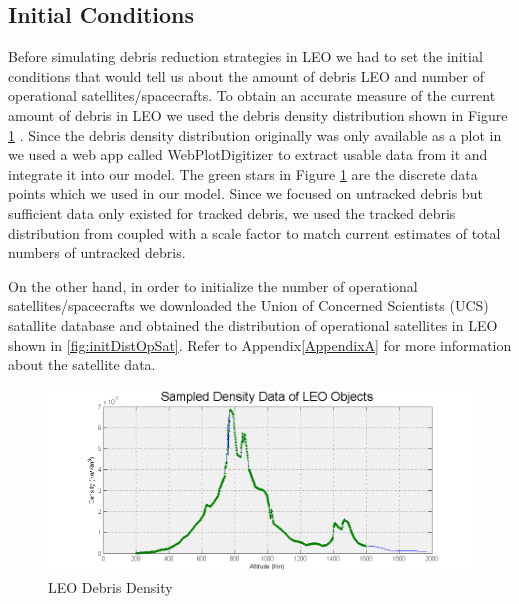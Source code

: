 \documentclass[pre,12pt]{revtex4-1}
\begin{document}
\subsection{Initial Conditions}
Before simulating debris reduction strategies in LEO we had to set the initial conditions that would tell us about the amount of debris LEO and number of operational satellites/spacecrafts. To obtain an accurate measure of the current amount of debris in LEO we used the debris density distribution shown in Figure \ref{fig:debris_density} \cite{NasaLEODensity}. Since the debris density distribution originally was only available as a plot in \cite{NasaLEODensity} we used a web app called WebPlotDigitizer \cite{webPlotDigitizer} to extract usable data from it and integrate it into our model. The green stars in Figure \ref{fig:debris_density} are the discrete data points which we used in our model. Since we focused on untracked debris but sufficient data only existed for tracked debris, we used the tracked debris distribution from \cite{NasaLEODensity} coupled with a scale factor to match current estimates of total numbers of untracked debris.

On the other hand, in order to initialize the number of operational satellites/spacecrafts we downloaded the Union of Concerned Scientists (UCS) satallite database \cite{satelliteDB} and obtained the distribution of operational satellites in LEO shown in \ref{fig:initDistOpSat}. Refer to Appendix\ref{AppendixA} for more information about the satellite data.

\begin{figure}[h]
	\includegraphics[width=.8\linewidth]{"Figures/density_data"}
	\caption{\footnotesize LEO Debris Density}
	\label{fig:debris_density}
\end{figure}
\end{document}
